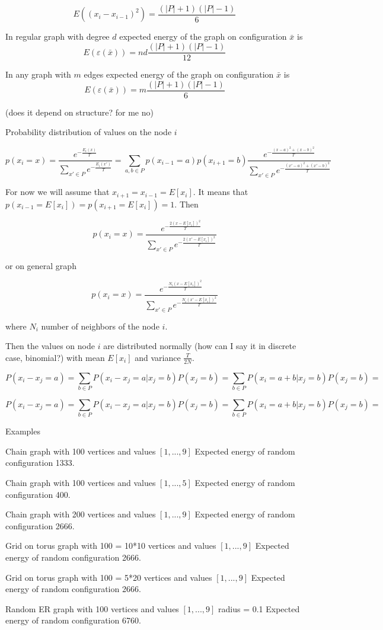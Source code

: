 \documentclass[12pt]{report}
\begin{document}
$$E\left( (x_i - x_{i-1})^2 \right) = \frac{(|P|+1)(|P|-1)}{6}$$




In regular graph with degree $d$ expected energy of the graph on configuration $\bar{x}$ is
$$E(\varepsilon (\bar{x})) =  nd\frac{(|P|+1)(|P|-1)}{12}$$

In any graph with $m$ edges expected energy of the graph on configuration $\bar{x}$ is
$$E(\varepsilon (\bar{x})) =  m\frac{(|P|+1)(|P|-1)}{6}$$

(does it depend on structure? for me no)

Probability distribution of values on the node $i$

$$ p(x_i = x) = \frac{ e^{-\frac{E_i(x)}{T}} }{ \sum\limits_{x'\in P} e^{-\frac{E_i(x')}{T}}}  = 
\sum\limits_{a, b\in P} p(x_{i - 1}  = a)p(x_{i+1} = b)
\frac{ e^{-\frac{(x - a)^2 + (x - b)^2}{T}} }{ \sum\limits_{x'\in P} e^{-\frac{(x' - a)^2 + (x' - b)^2}{T}}}  $$
  
For now we will assume that $x_{i+1} = x_{i-1} = E[x_i]$. It means that 
$p(x_{i-1}  = E[x_i]) = p(x_{i+1} = E[x_i]) = 1$. Then

$$ p(x_i = x) = 
\frac{ e^{-\frac{2(x - E[x_i])^2}{T}} }{ \sum\limits_{x'\in P} e^{-\frac{2(x' - E[x_i])^2}{T}}}$$

or on general graph

$$ p(x_i = x) = 
\frac{ e^{-\frac{N_i(x - E[x_i])^2}{T}} }{ \sum\limits_{x'\in P} e^{-\frac{N_i(x' - E[x_i])^2}{T}}}$$

where $N_i$ number of neighbors of the node $i$.

Then the values on node $i$ are distributed normally (how can I say it in discrete case, binomial?) with mean $E[x_i]$ and variance $\frac{T}{2N}$.

$$P(x_i-x_j = a) = \sum\limits_{b \in P} P(x_i-x_j=a | x_j = b)P(x_j = b) = \sum\limits_{b \in P} P(x_i=a+b | x_j = b)P(x_j = b) = $$

$$P(x_i-x_j = a) = \sum\limits_{b \in P} P(x_i-x_j=a | x_j = b)P(x_j = b) = \sum\limits_{b \in P} P(x_i=a+b | x_j = b)P(x_j = b) = $$

Examples

Chain graph with 100 vertices and values $[1, ..., 9]$
Expected energy of random configuration 1333.

Chain graph with 100 vertices and values $[1, ..., 5]$
Expected energy of random configuration 400.

Chain graph with 200 vertices and values $[1, ..., 9]$
Expected energy of random configuration 2666.

Grid on torus graph with 100 = 10*10 vertices and values $[1, ..., 9]$
Expected energy of random configuration 2666.

Grid on torus graph with 100 = 5*20 vertices and values $[1, ..., 9]$
Expected energy of random configuration 2666.

Random ER graph with 100 vertices and values $[1, ..., 9]$ radius = 0.1
Expected energy of random configuration 6760.
\end{document}
